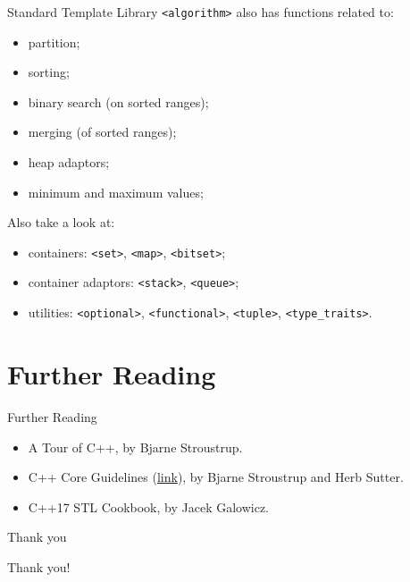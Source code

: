 \documentclass[presentation]{beamer}
\begin{document}
\begin{frame}[label={sec:org56751b4},fragile]{Standard Template Library}
 \texttt{<algorithm>} also has functions related to:
\begin{itemize}
\item partition;
\item sorting;
\item binary search (on sorted ranges);
\item merging (of sorted ranges);
\item heap adaptors;
\item minimum and maximum values;
\end{itemize}
Also take a look at:
\begin{itemize}
\item containers: \texttt{<set>}, \texttt{<map>}, \texttt{<bitset>};
\item container adaptors: \texttt{<stack>}, \texttt{<queue>};
\item utilities: \texttt{<optional>}, \texttt{<functional>}, \texttt{<tuple>}, \texttt{<type\_traits>}.
\end{itemize}
\end{frame}
\section{Further Reading}
\label{sec:org6f5532e}
\begin{frame}[label={sec:org2b7cebe}]{Further Reading}
\begin{itemize}
\item A Tour of C++, by Bjarne Stroustrup.
\item C++ Core Guidelines (\href{https://isocpp.github.io/CppCoreGuidelines/CppCoreGuidelines}{link}), by Bjarne Stroustrup and Herb Sutter.
\item C++17 STL Cookbook, by Jacek Galowicz.
\end{itemize}
\end{frame}

\begin{frame}[label={sec:org31c6ee1}]{Thank you}
\begin{center}
\Huge{Thank you!}
\end{center}
\end{frame}
\end{document}
